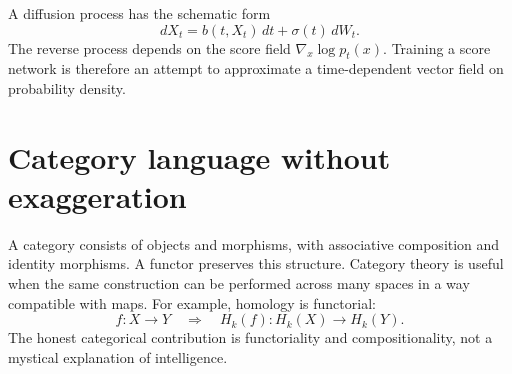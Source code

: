 A diffusion process has the schematic form
\[
  dX_t=b(t,X_t)\,dt+\sigma(t)\,dW_t.
\]
The reverse process depends on the score field $\nabla_x\log p_t(x)$.  Training a score network is therefore an attempt to approximate a time-dependent vector field on probability density.

\section{Category language without exaggeration}

A category consists of objects and morphisms, with associative composition and identity morphisms.  A functor preserves this structure.  Category theory is useful when the same construction can be performed across many spaces in a way compatible with maps.  For example, homology is functorial:
\[
  f:X\to Y \quad\Longrightarrow\quad H_k(f):H_k(X)\to H_k(Y).
\]
The honest categorical contribution is functoriality and compositionality, not a mystical explanation of intelligence.
